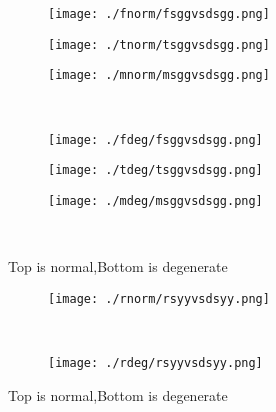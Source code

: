 \documentclass[aps,floats,floatfix,nofootinbib]{revtex4-1}
\begin{document}
\begin{center}
\begin{figure}
\begin{subfigure}{0.3\textwidth}
\texttt{[image: ./fnorm/fsggvsdsgg.png]}
\label{}
\end{subfigure}
\begin{subfigure}{0.3\textwidth}
\texttt{[image: ./tnorm/tsggvsdsgg.png]}
\label{}
\end{subfigure}
\begin{subfigure}{0.3\textwidth}
\texttt{[image: ./mnorm/msggvsdsgg.png]}
\label{}
\end{subfigure}\\
\begin{subfigure}{0.3\textwidth}
\texttt{[image: ./fdeg/fsggvsdsgg.png]}
\label{}
\end{subfigure}
\begin{subfigure}{0.3\textwidth}
\texttt{[image: ./tdeg/tsggvsdsgg.png]}
\label{}
\end{subfigure}
\begin{subfigure}{0.3\textwidth}
\texttt{[image: ./mdeg/msggvsdsgg.png]}
\label{}
\end{subfigure}\\
\caption{Top is normal,Bottom is degenerate}
\end{figure}
\end{center}

\begin{center}
\begin{figure}
\begin{subfigure}{0.95\textwidth}
\texttt{[image: ./rnorm/rsyyvsdsyy.png]}
\label{}
\end{subfigure}\\
\begin{subfigure}{0.95\textwidth}
\texttt{[image: ./rdeg/rsyyvsdsyy.png]}
\label{}
\end{subfigure}
\caption{Top is normal,Bottom is degenerate}
\end{figure}
\end{center}
\end{document}
